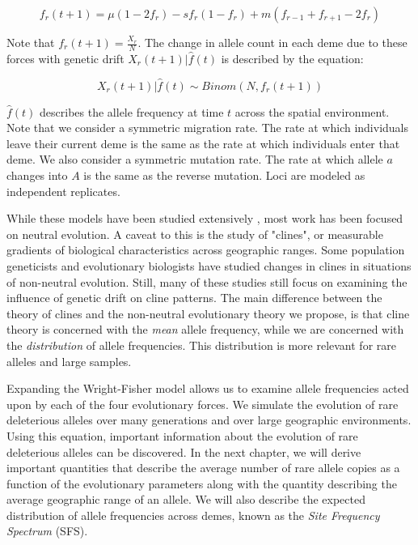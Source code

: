 \begin{equation}\label{eq:f_r,t}
    f_r(t+1) = \mu(1-2f_r)-sf_r (1-f_r) + m (f_{r-1}+f_{r+1}-2f_r)
\end{equation}

Note that $f_r(t+1) = \frac{X_r}{N}$. The change in allele count in each deme due to these forces with genetic drift $X_r(t+1) | \hat{f}(t)$ is described by the equation:

\begin{equation}
    \label{eq:model}
    X_r(t+1) | \hat{f}(t) \sim Binom(N,f_r(t+1))
\end{equation}


$\hat{f}(t)$ describes the allele frequency at time $t$ across the spatial environment. Note that we consider a symmetric migration rate. The rate at which individuals leave their current deme is the same as the rate at which individuals enter that deme. We also consider a symmetric mutation rate. The rate at which allele $a$ changes into $A$ is the same as the reverse mutation. Loci are modeled as independent replicates.

While these models have been studied extensively \cite{felsenstein_genetic_1975}\cite{malecot_heterozygosity_1975}\cite{sawyer_branching_1976}, most work has been focused on neutral evolution. A caveat to this is the study of "clines", or measurable gradients of biological characteristics across geographic ranges. Some population geneticists and evolutionary biologists have studied changes in clines in situations of non-neutral evolution. \cite{baines_role_2004} Still, many of these studies still focus on examining the influence of genetic drift on cline patterns. \cite{polechova_genetic_2011} The main difference between the theory of clines and the non-neutral evolutionary theory we propose, is that cline theory is concerned with the \textit{mean} allele frequency, while we are concerned with the \textit{distribution} of allele frequencies.\cite{vasemagi_adaptive_2006} This distribution is more relevant for rare alleles and large samples. 


Expanding the Wright-Fisher model allows us to examine allele frequencies acted upon by each of the four evolutionary forces. We simulate the evolution of rare deleterious alleles over many generations and over large geographic environments. Using this equation, important information about the evolution of rare deleterious alleles can be discovered. In the next chapter, we will derive important quantities that describe the average number of rare allele copies as a function of the evolutionary parameters along with the quantity describing the average geographic range of an allele. We will also describe the expected distribution of allele frequencies across demes, known as the \textit{Site Frequency Spectrum} (SFS).

